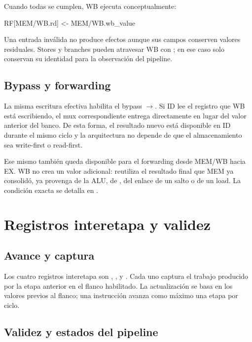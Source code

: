 Cuando todas se cumplen, WB ejecuta conceptualmente:

\begin{codebox}
RF[MEM/WB.rd] <- MEM/WB.wb_value
\end{codebox}

Una entrada inválida no produce efectos aunque sus campos conserven valores
residuales. Stores y branches pueden atravesar WB con ; en
ese caso solo conservan su identidad para la observación del pipeline.

\subsection{Bypass y forwarding}

La misma escritura efectiva habilita el bypass $\rightarrow$.
Si ID lee el registro que WB está escribiendo, el mux correspondiente entrega
directamente  en lugar del valor anterior del banco. De
esta forma, el resultado nuevo está disponible en ID durante el mismo ciclo y
la arquitectura no depende de que el almacenamiento sea write-first o
read-first.

Ese mismo  también queda disponible para el forwarding
desde MEM/WB hacia EX. WB no crea un valor adicional: reutiliza el resultado
final que MEM ya consolidó, ya provenga de la ALU, de , del enlace de
un salto o de un load. La condición exacta se detalla en
.

\section{Registros interetapa y validez}\label{sec:registros-interetapa}

\subsection{Avance y captura}

Los cuatro registros interetapa son ,
,  y .
Cada uno captura el trabajo producido por la etapa anterior en el flanco
habilitado. La actualización se basa en los valores previos al flanco; una
instrucción avanza como máximo una etapa por ciclo.

\subsection{Validez y estados del pipeline}


